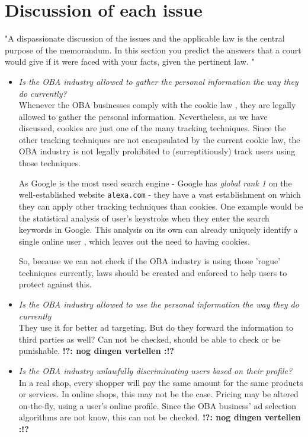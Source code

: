 \documentclass[11pt]{article}
\newcommand{\tocheck}[1]{{\bf !?: #1 :!?}}
\begin{document}
\section{Discussion of each issue}
"A dispassionate discussion of the issues and the applicable law is the central purpose of
the memorandum. In this section you predict the answers that a court would give if it
were faced with your facts, given the pertinent law.
"
\begin{itemize}
	\item \textit{Is the OBA industry allowed to gather the personal information the way they do currently?}\\
			Whenever the OBA businesses comply with the cookie law \cite{cookielaw}, they are legally allowed to gather the personal information. Nevertheless, as we have discussed, cookies are just one of the many tracking techniques. Since the other tracking techniques are not encapsulated by the current cookie law, the OBA industry is not legally prohibited to (surreptitiously) track users using those techniques. 

			As Google is the most used search engine - Google has \textit{global rank 1} \cite{googlerank1} on the well-established website \texttt{alexa.com} - they have a vast establishment on which they can apply other tracking techniques than cookies. One example would be the statistical analysis of user's keystroke when they enter the search keywords in Google. This analysis on its own can already uniquely identify a single online user \cite{keystroke}, which leaves out the need to having cookies.

			So, because we can not check if the OBA industry is using those 'rogue' techniques currently, laws should be created and enforced to help users to protect against this.


	\item \textit{Is the OBA industry allowed to use the personal information the way they do currently}\\
				They use it for better ad targeting. But do they forward the information to third parties as well? Can not be checked, should be able to check or be punishable. \tocheck{nog dingen vertellen}

	\item \textit{Is the OBA industry unlawfully discriminating users based on their profile?}\\
			In a real shop, every shopper will pay the same amount for the same products or services. In online shops, this may not be the case. Pricing may be altered on-the-fly, using a user's online profile. Since the OBA business' ad selection algorithms are not know, this can not be checked. \tocheck{nog dingen vertellen}

\end{itemize}
\end{document}
